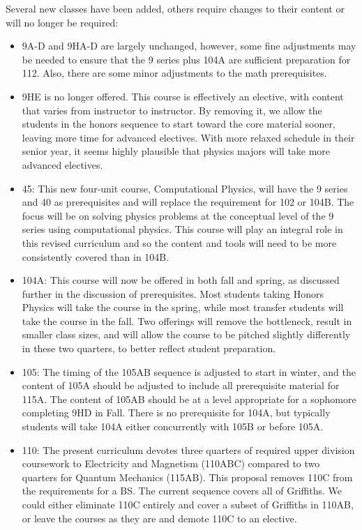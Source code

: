\documentclass[12pt]{article}
\begin{document}
Several new classes have been added, others require changes to their content or will no longer be required:
\begin{itemize}
\item 9A-D and 9HA-D are largely unchanged, however, some fine adjustments may be needed to ensure that the 9 series plus 104A are sufficient preparation for 112.  Also, there are some minor adjustments to the math prerequisites.

\item 9HE is no longer offered.  This course is effectively an elective, with content that varies from instructor to instructor.  By removing it, we allow the students in the honors sequence to start toward the core material sooner, leaving more time for advanced electives. With more relaxed schedule in their senior year, it seems highly plausible that physics majors will take more advanced electives.

\item 45:  This new four-unit course, Computational Physics, will have the 9 series and 40 as prerequisites and will replace the requirement for 102 or 104B.  
The focus will be on solving physics problems at the conceptual level of the 9 series using computational physics.  This course will play an integral role in this revised curriculum and so the content and tools will need to be more consistently covered than in 104B.  

\item 104A:  This course will now be offered in both fall and spring, as discussed further in the discussion of prerequisites.  Most students taking Honors Physics will take the course in the spring, while most transfer students will take the course in the fall.  Two offerings will remove the bottleneck, result in smaller class sizes, and will allow the course to be pitched slightly differently in these two quarters, to better reflect student preparation.

\item 105:  The timing of the 105AB sequence is adjusted to start in winter, and the content of 105A should be adjusted to include all prerequisite material for 115A.  The content of 105AB should be at a level appropriate for a sophomore completing 9HD in Fall.  There is no prerequisite for 104A, but typically students will take 104A either concurrently with 105B or before 105A.

\item 110:  The present curriculum devotes three quarters of required upper division coursework to Electricity and Magnetism (110ABC) compared to two quarters for Quantum Mechanics (115AB).  This proposal removes 110C from the requirements for a BS.  The current sequence covers all of Griffiths.  We could either eliminate 110C entirely and cover a subset of Griffiths in 110AB, or leave the courses as they are and demote 110C to an elective.


\end{itemize}
\end{document}
